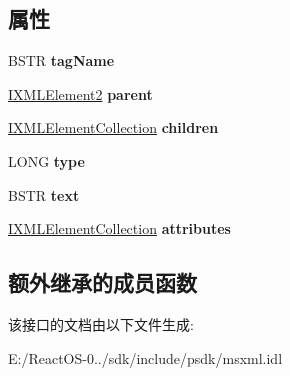 \subsection*{属性}
\begin{DoxyCompactItemize}
\item 
\mbox{\label{interface_m_s_x_m_l_1_1_i_x_m_l_element2_a61fe83e6a74996c076e9f0367ca3bafb}} 
B\+S\+TR {\bfseries tag\+Name}
\item 
\mbox{\label{interface_m_s_x_m_l_1_1_i_x_m_l_element2_a9e319ceee00e7e01944ced4b44afb721}} 
\hyperlink{interface_m_s_x_m_l_1_1_i_x_m_l_element2}{I\+X\+M\+L\+Element2} {\bfseries parent}
\item 
\mbox{\label{interface_m_s_x_m_l_1_1_i_x_m_l_element2_a6895c65d908c38af3570b401fa4fadce}} 
\hyperlink{interface_m_s_x_m_l_1_1_i_x_m_l_element_collection}{I\+X\+M\+L\+Element\+Collection} {\bfseries children}
\item 
\mbox{\label{interface_m_s_x_m_l_1_1_i_x_m_l_element2_afc99a3a1f33686c7cfd6333f84cbe0b0}} 
L\+O\+NG {\bfseries type}
\item 
\mbox{\label{interface_m_s_x_m_l_1_1_i_x_m_l_element2_a09d9b0f5d0831cba3a0e35cb0af30a68}} 
B\+S\+TR {\bfseries text}
\item 
\mbox{\label{interface_m_s_x_m_l_1_1_i_x_m_l_element2_ae79f69c8d42efbe06968b26959349a10}} 
\hyperlink{interface_m_s_x_m_l_1_1_i_x_m_l_element_collection}{I\+X\+M\+L\+Element\+Collection} {\bfseries attributes}
\end{DoxyCompactItemize}
\subsection*{额外继承的成员函数}


该接口的文档由以下文件生成\+:\begin{DoxyCompactItemize}
\item 
E\+:/\+React\+O\+S-\/0../sdk/include/psdk/msxml.\+idl\end{DoxyCompactItemize}
